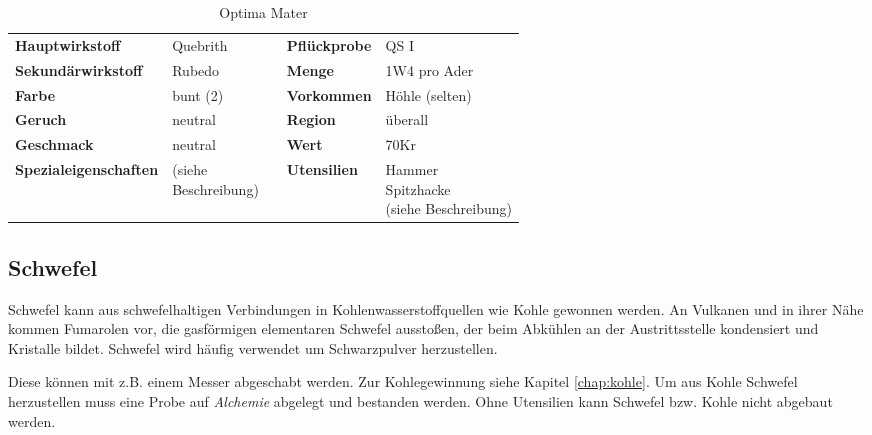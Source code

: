 \begin{table}[h] 
\begin{center} 
\begin{tabular}{|l|l|p{1cm}|l|l|} 
  	\cline{1-2} \cline{4-5} 
  	\textbf{Hauptwirkstoff} & Quebrith && \textbf{Pflückprobe} & QS I \\ \cline{1-2} \cline{4-5} 
  	\textbf{Sekundärwirkstoff} & Rubedo && \textbf{Menge} & 1W4 pro Ader \\ \cline{1-2} \cline{4-5} 
  	\textbf{Farbe} & bunt (2) && \textbf{Vorkommen} & Höhle (selten) \\ \cline{1-2} \cline{4-5} 
  	\textbf{Geruch} & neutral && \textbf{Region} & überall \\ \cline{1-2} \cline{4-5} 
  	\textbf{Geschmack} & neutral && \textbf{Wert} & 70Kr \\ \cline{1-2} \cline{4-5} 
  	\textbf{Spezialeigenschaften} & \brcell{(siehe \\ Beschreibung)} && \textbf{Utensilien} & \brcell{Hammer \\ Spitzhacke \\ (siehe Beschreibung)} \\ \cline{1-2} \cline{4-5} 
\end{tabular} 
\end{center} 
\caption{Optima Mater} 
\label{tab:optima_mater} 
\end{table}


\subsection{Schwefel}
Schwefel kann aus schwefelhaltigen Verbindungen in Kohlenwasserstoffquellen wie Kohle gewonnen werden. An Vulkanen und in ihrer Nähe kommen Fumarolen vor, die gasförmigen elementaren Schwefel ausstoßen, der beim Abkühlen an der Austrittsstelle kondensiert und Kristalle bildet. Schwefel wird häufig verwendet um Schwarzpulver herzustellen.

Diese können mit z.B. einem Messer abgeschabt werden. Zur Kohlegewinnung siehe Kapitel \ref{chap:kohle}. Um aus Kohle Schwefel herzustellen muss eine Probe auf \textit{Alchemie} abgelegt und bestanden werden. Ohne Utensilien kann Schwefel bzw. Kohle nicht abgebaut werden.

